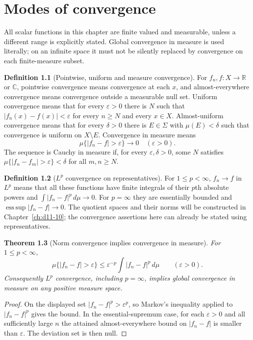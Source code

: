 \documentclass[11pt,oneside,openany]{book}
\newtheorem{theorem}{Theorem}[chapter]
\theoremstyle{definition}
\newtheorem{definition}[theorem]{Definition}
\theoremstyle{remark}
\newcommand{\R}{\mathbb R}\newcommand{\C}{\mathbb C}
\newcommand{\eps}{\varepsilon}\newcommand{\ee}{\varepsilon}
\DeclareMathOperator{\esssup}{ess\,sup}\DeclareMathOperator{\Var}{Var}
\newcommand{\family}[1]{}
\begin{document}


\chapter{Modes of convergence}\label{ch:d11-07}
All scalar functions in this chapter are finite valued and measurable, unless
a different range is explicitly stated. Global convergence in measure is
used literally; on an infinite space it must not be silently replaced by
convergence on each finite-measure subset.

\begin{definition}[Pointwise, uniform and measure convergence]
\family{D11.07.convergence_modes}\label{d11:07:convergence-modes}
For $f_n,f:X\to\R$ or $\C$, pointwise convergence means convergence at
each $x$, and almost-everywhere convergence means convergence outside a
measurable null set. Uniform convergence means that for every $\eps>0$
there is $N$ such that $|f_n(x)-f(x)|<\eps$ for every $n\geq N$ and every
$x\in X$. Almost-uniform convergence means that for every $\delta>0$
there is $E\in\Sigma$ with $\mu(E)<\delta$ such that convergence is
uniform on $X\setminus E$. Convergence in measure means
\[
 \mu\{|f_n-f|>\eps\}\longrightarrow0\quad(\eps>0).
\]
The sequence is Cauchy in measure if, for every $\eps,\delta>0$, some $N$
satisfies $\mu\{|f_n-f_m|>\eps\}<\delta$ for all $m,n\geq N$.
\end{definition}

\begin{definition}[$L^p$ convergence on representatives]
\family{D11.07.lp_convergence}\label{d11:07:lp-convergence}
For $1\leq p<\infty$, $f_n\to f$ in $L^p$ means that all these functions
have finite integrals of their $p$th absolute powers and
$\int|f_n-f|^p\,d\mu\to0$. For $p=\infty$ they are essentially bounded
and $\esssup|f_n-f|\to0$. The quotient spaces and their norms will be
constructed in Chapter~\ref{ch:d11-10}; the convergence assertions here
can already be stated using representatives.
\end{definition}

\begin{theorem}[Norm convergence implies convergence in measure]
\family{D11.07.norm_to_measure}\label{d11:07:norm-to-measure}
For $1\leq p<\infty$,
\[
 \mu\{|f_n-f|>\eps\}\leq\eps^{-p}\int|f_n-f|^p\,d\mu
 \qquad(\eps>0).
\]
Consequently $L^p$ convergence, including $p=\infty$, implies global
convergence in measure on any positive measure space.
\end{theorem}
\begin{proof}
On the displayed set $|f_n-f|^p>\eps^p$, so Markov's inequality applied
to $|f_n-f|^p$ gives the bound. In the essential-supremum case, for each
$\eps>0$ and all sufficiently large $n$ the attained almost-everywhere
bound on $|f_n-f|$ is smaller than $\eps$. The deviation set is then null.
\end{proof}
\end{document}
